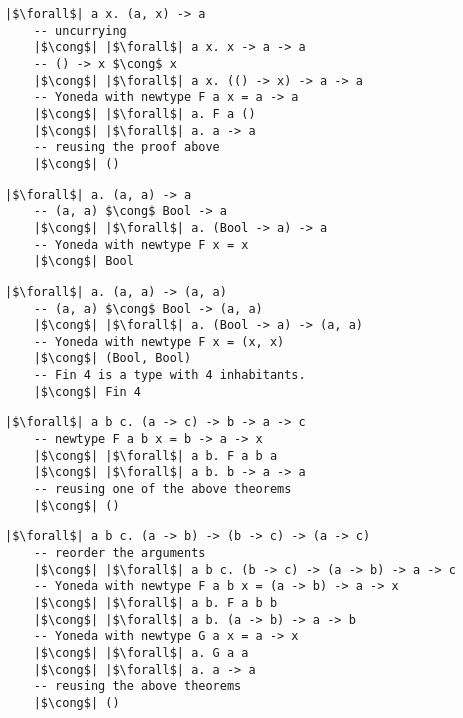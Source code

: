 \documentclass[tikz]{beamer}
\theoremstyle{definition}
\begin{document}
\begin{frame}[fragile]
\begin{verbatim}
|$\forall$| a x. (a, x) -> a
    -- uncurrying
    |$\cong$| |$\forall$| a x. x -> a -> a
    -- () -> x $\cong$ x
    |$\cong$| |$\forall$| a x. (() -> x) -> a -> a
    -- Yoneda with newtype F a x = a -> a
    |$\cong$| |$\forall$| a. F a ()
    |$\cong$| |$\forall$| a. a -> a
    -- reusing the proof above
    |$\cong$| ()
\end{verbatim}
\end{frame}

\begin{frame}[fragile]
\begin{verbatim}
|$\forall$| a. (a, a) -> a
    -- (a, a) $\cong$ Bool -> a
    |$\cong$| |$\forall$| a. (Bool -> a) -> a
    -- Yoneda with newtype F x = x
    |$\cong$| Bool
\end{verbatim}
\end{frame}

\begin{frame}[fragile]
\begin{verbatim}
|$\forall$| a. (a, a) -> (a, a)
    -- (a, a) $\cong$ Bool -> (a, a)
    |$\cong$| |$\forall$| a. (Bool -> a) -> (a, a)
    -- Yoneda with newtype F x = (x, x)
    |$\cong$| (Bool, Bool)
    -- Fin 4 is a type with 4 inhabitants.
    |$\cong$| Fin 4
\end{verbatim}
\end{frame}

\begin{frame}[fragile]
\begin{verbatim}
|$\forall$| a b c. (a -> c) -> b -> a -> c
    -- newtype F a b x = b -> a -> x
    |$\cong$| |$\forall$| a b. F a b a
    |$\cong$| |$\forall$| a b. b -> a -> a
    -- reusing one of the above theorems
    |$\cong$| ()
\end{verbatim}
\end{frame}

\begin{frame}[fragile]
\begin{verbatim}
|$\forall$| a b c. (a -> b) -> (b -> c) -> (a -> c)
    -- reorder the arguments
    |$\cong$| |$\forall$| a b c. (b -> c) -> (a -> b) -> a -> c
    -- Yoneda with newtype F a b x = (a -> b) -> a -> x
    |$\cong$| |$\forall$| a b. F a b b
    |$\cong$| |$\forall$| a b. (a -> b) -> a -> b
    -- Yoneda with newtype G a x = a -> x
    |$\cong$| |$\forall$| a. G a a
    |$\cong$| |$\forall$| a. a -> a
    -- reusing the above theorems
    |$\cong$| ()
\end{verbatim}
\end{frame}
\end{document}
